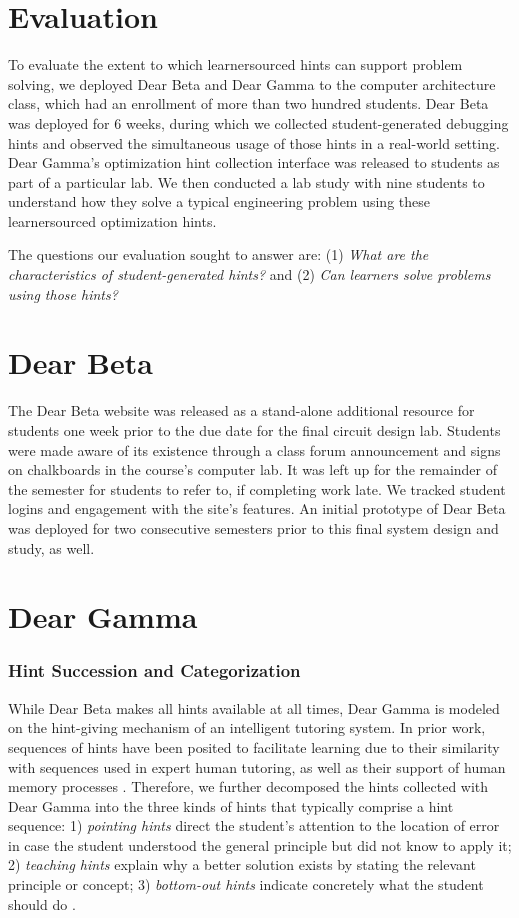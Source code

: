 \section{Evaluation}

To evaluate the extent to which learnersourced hints can support problem solving, we deployed Dear Beta and Dear Gamma to the computer architecture class, which had an enrollment of more than two hundred students. Dear Beta was deployed for 6 weeks, during which we collected student-generated debugging hints and observed the simultaneous usage of those hints in a real-world setting. Dear Gamma's optimization hint collection interface was released to students as part of a particular lab. We then conducted a lab study with nine students to understand how they solve a typical engineering problem using these learnersourced optimization hints. 

The questions our evaluation sought to answer are: (1) {\it What are the characteristics of student-generated hints?} and (2) {\it Can learners solve problems using those hints?}

\section{Dear Beta}
The Dear Beta website was released as a stand-alone additional resource for students one week prior to the due date for the final circuit design lab. Students were made aware of its existence through a class forum announcement and signs on chalkboards in the course's computer lab. It was left up for the remainder of the semester for students to refer to, if completing work late. We tracked student logins and engagement with the site's features. An initial prototype of Dear Beta was deployed for two consecutive semesters prior to this final system design and study, as well.

\section{Dear Gamma}

\subsubsection{Hint Succession and Categorization}
While Dear Beta makes all hints available at all times, Dear Gamma is modeled on the hint-giving mechanism of an intelligent tutoring system. In prior work, sequences of hints have been posited to facilitate learning due to their similarity with sequences used in expert human tutoring, as well as their support of human memory processes \cite{sottilare2014design}. Therefore, we further decomposed the hints collected with Dear Gamma into the three kinds of hints that typically comprise a hint sequence: 1) \textit{pointing hints} direct the student's attention to the location of error in case the student understood the general principle but did not know to apply it; 2) \textit{teaching hints} explain why a better solution exists by stating the relevant principle or concept; 3) \textit{bottom-out hints} indicate concretely what the student should do \cite{andes}. 

